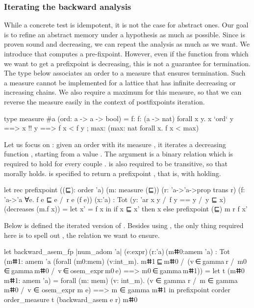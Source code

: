 \documentclass{llncs}
\begin{document}
\subsubsection{Iterating the backward analysis}
%
While a concrete test is idempotent, it is not the case for
abstract ones.
%
Our goal is to refine an abstract memory under a hypothesis as
much as possible.
%
Since  is proven sound and decreasing, we can
repeat the analysis as much as we want. We introduce
 that computes a pre-fixpoint.
%
However, even if the function from which we want to get a
prefixpoint is decreasing, this is not a guarantee for
termination.
%
The type  below associates an order to a measure
that ensures termination.
%
Such a measure cannot be implemented for a lattice that has
infinite decreasing or increasing chains.
%
We also require a maximum for this measure, so that we can reverse
the measure easily in the context of postfixpoints iteration.
%
\begin{fstarcode}
type measure #a (ord: a -> a -> bool) 
  = { f: f: (a -> nat) {forall x y. x `ord` y ==> x !\notPropEq{}! y ==> f x < f y}
    ; max: (max: nat {forall x. f x < max}) }
\end{fstarcode}
%
Let us focus on : given an order  with
its measure , it iterates a decreasing function ,
starting from a value .
%
The argument  is a binary relation which is required to
hold for every couple .
%
 is also required to be transitive, so that morally
%
 holds.
%
 is specified to return a prefixpoint
, that is, with  holding.
%
\begin{fstarcode}
let rec prefixpoint ((⊑): order 'a) (m: measure (⊑))
  (r: 'a->'a->prop {trans r}) (f: 'a->'a {∀e. f e ⊑ e /\ r e (f e)}) (x:'a) 
  : Tot (y: 'a{r x y /\ f y == y /\ y ⊑ x}) (decreases (m.f x))
  = let x' = f x in if x ⊑ x' then x else prefixpoint (⊑) m r f x'
\end{fstarcode}
%
Below is defined  the iterated version of
.
%
Besides using , the only thing required here is
to spell out , the relation we want to ensure.
%
\begin{fstarcode}
let backward_asem_fp {|num_adom 'a|} (e:expr) (r:'a) (mⵌ0:amem 'a)
  : Tot (mⵌ1: amem 'a {(forall (m0:mem) (v:int_m). mⵌ1 ⊑ mⵌ0 /\
                   (v ∈ gamma r /\ m0 ∈ gamma mⵌ0 /\ v ∈ osem_expr m0 e) ==> m0 ∈ gamma mⵌ1)})
  = let t (mⵌ0 mⵌ1: amem 'a) = forall (m: mem) (v: int_m).
      (v ∈ gamma r /\ m ∈ gamma mⵌ0 /\ v ∈ osem_expr m e) ==> m ∈ gamma mⵌ1 in
    prefixpoint corder order_measure t (backward_asem e r) mⵌ0
\end{fstarcode}
%
\end{document}
